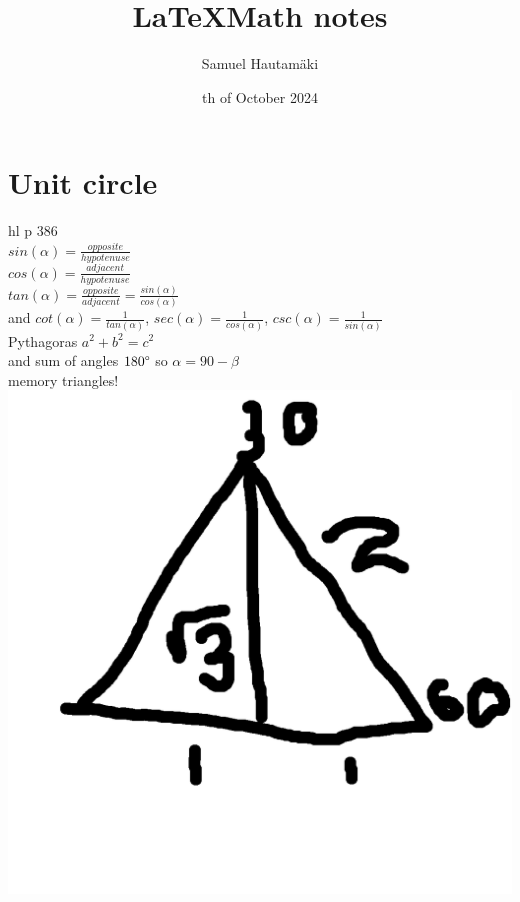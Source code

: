 \documentclass{article}
\title{\LaTeX Math notes}
\author{Samuel Hautamäki}
\date{th of October 2024}
\begin{document}
  \maketitle
   
  \section{Unit circle}
  hl p 386\\
  $sin(\alpha)=\frac{opposite}{hypotenuse}$\\
  $cos(\alpha)=\frac{adjacent}{hypotenuse}$\\
  $tan(\alpha)=\frac{opposite}{adjacent}=\frac{sin(\alpha)}{cos(\alpha)}$\\
  and $cot(\alpha)=\frac{1}{tan(\alpha)}$, $sec(\alpha)=\frac{1}{cos(\alpha)}$, $csc(\alpha)=\frac{1}{sin(\alpha)}$\\
  Pythagoras $a^2+b^2=c^2$\\
  and sum of angles $180\degree$ so $\alpha=90-\beta$\\
  memory triangles!\\
  \includegraphics{memorytriangleotherone.png}
\end{document}

